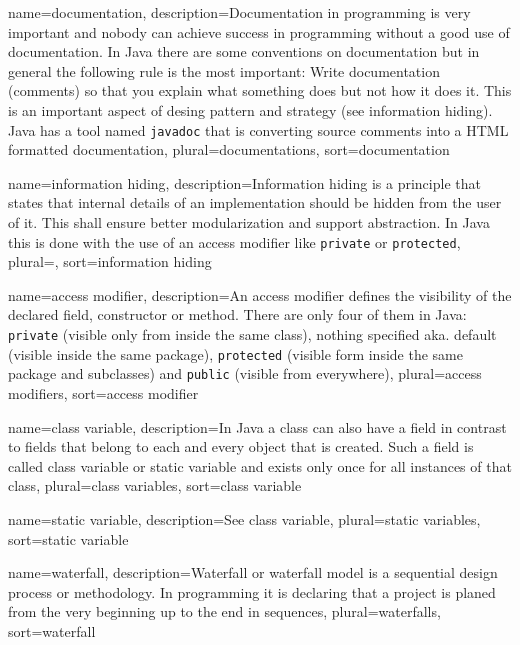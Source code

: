 {
	name=documentation,
	description={Documentation in programming is very important and nobody
		can achieve success in programming without a good use of
		documentation. In Java there are some conventions on 
		documentation but in general the following rule is the most
		important: Write documentation (comments) so that you 
		explain what something does but not how it does it. This is
		an important aspect of desing pattern and strategy (see
		\gls{information hiding}). 
		Java has a tool named \lstinline!javadoc!
		that is converting source comments into a HTML formatted
		documentation},
	plural=documentations,
	sort=documentation
}

{
	name={information hiding},
	description={Information hiding is a principle that states that 
		internal details of an implementation should be hidden
		from the user of it. This shall ensure better modularization
		and support abstraction. In Java this is done with the use
		of an \gls{access modifier} like \lstinline!private! or
		\lstinline!protected!},
	plural={},
	sort={information hiding}
}

{
	name={access modifier},
	description={An access modifier defines the visibility of the 
		declared field, constructor or method. There are only four of
		them in Java: 
		\lstinline!private! (visible only from inside the same class), 
		nothing specified aka. default (visible inside the same package),
		\lstinline!protected! (visible form inside the same package 
			and subclasses) and
		\lstinline!public! (visible from everywhere)},
	plural={access modifiers},
	sort={access modifier}
}

{
	name={class variable},
	description={In Java a class can also have a field in contrast to 
		fields that belong to each and every object that is created.
		Such a field is called class variable or 
		\gls{static variable} and exists only once for all instances
		of that class},
	plural={class variables},
	sort={class variable}
}

{
	name={static variable},
	description={See \gls{class variable}},
	plural={static variables},
	sort={static variable}	
}

{
	name=waterfall,
	description={Waterfall or waterfall model is a sequential design 
		process or methodology. In programming it is declaring 
		that a project is planed from the very beginning up to 
		the end in sequences},
	plural=waterfalls,
	sort=waterfall
}

